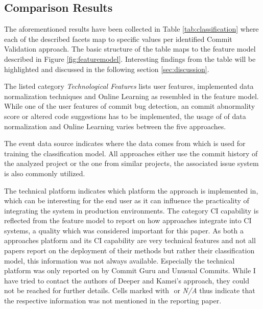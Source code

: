 
\subsection{Comparison Results}

The aforementioned results have been collected in Table \ref{tab:classification} where each of the described facets map to specific values per identified Commit Validation approach. The basic structure of the table maps to the feature model described in Figure \ref{fig:featuremodel}. 
Interesting findings from the table will be highlighted and discussed in the following section \ref{sec:discussion}.

The listed category \textit{Technological Features} lists user features, implemented data normalization techniques and Online Learning as resembled in the feature model. While one of the user features of commit bug detection, an commit abnormality score or altered code suggestions has to be implemented, the usage of of data normalization and Online Learning varies between the five approaches.

The event data source indicates where the data comes from which is used for training the classification model. All approaches either use the commit history of the analyzed project or the one from similar projects, the associated issue system is also commonly utilized.

\newcommand{\pointyes}{\CIRCLE}
\newcommand{\pnotapplicable}{\LEFTcircle}
\newcommand{\pointno}{\Circle}

The technical platform indicates which platform the approach is implemented in, which can be interesting for the end user as it can influence the practicality of integrating the system in production environments. The category CI capability is reflected from the feature model to report on how approaches integrate into CI systems, a quality which was considered important for this paper. As both a approaches platform and its CI capability are very technical features and not all papers report on the deployment of their methods but rather their classification model, this information was not always available. Especially the technical platform was only reported on by Commit Guru and Unusual Commits. While I have tried to contact the authors of Deeper and Kamei's approach, they could not be reached for further details. Cells marked with \pnotapplicable $ $ or \textit{N/A} thus indicate that the respective information was not mentioned in the reporting paper.

